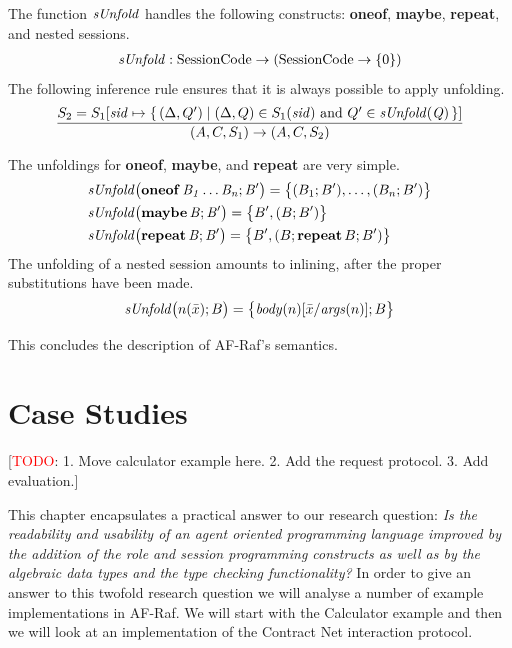 \documentclass[a4paper,12pt,oneside,fleqn]{book} %
\newcommand{\todo}[1]{[\textcolor{red}{TODO}: #1]}
\begin{document}
The function $\it sUnfold$ handles the following constructs: {\bf oneof},
{\bf maybe}, {\bf repeat}, and nested sessions.
\begin{align}
{\it sUnfold} : {\rm SessionCode}\to({\rm SessionCode}\to\{0\})
\end{align}
The following inference rule ensures that it is always possible to apply
unfolding.
\begin{align}
\frac
  {S_2=S_1[{\it sid}\mapsto\{\,(\Delta,Q')
    \mid\text{$(\Delta,Q)\in S_1({\it sid})$ and $Q'\in{\it sUnfold(Q)}$}\,\}]}
  {(A,C,S_1)\to(A,C,S_2)}
\end{align}

The unfoldings for {\bf oneof}, {\bf maybe}, and {\bf repeat} are very
simple.
\begin{align}
&{\it sUnfold\bigl({\bf oneof}\,B_1\ldots B_n; B'\bigr)}
  = \bigl\{ (B_1;B'),\ldots,(B_n;B')\bigr\}
\\
&{\it sUnfold\bigl({\bf maybe}\,B;B'\bigr)}
  = \bigl\{ B', (B;B')\bigr\} \\
&{\it sUnfold\bigl({\bf repeat}\,B;B'\bigr)}
  = \bigl\{ B', (B;{\bf repeat}\,B;B')\bigr\}
\end{align}
The unfolding of a nested session amounts to inlining, after the proper
substitutions have been made.
\begin{align}
{\it sUnfold}\bigl(n(\bar{x}); B\bigr)
  = \bigl\{ {\it body}(n)[\bar{x}/{\it args}(n)]; B \bigr\}
\end{align}

This concludes the description of AF-Raf's semantics.


\chapter{Case Studies}\label{ch:casestudy} %

\todo{1. Move calculator example here. 2. Add the request protocol. 3. Add
evaluation.}

This chapter encapsulates a practical answer to our research question:
\textit{Is the readability and usability of an agent oriented programming
  language improved by the addition of the role and session programming
  constructs as well as by the algebraic data types and the type checking
functionality?} In order to give an answer to this twofold research
question we will analyse a number of example implementations in AF-Raf. We
will start with the Calculator example and then we will look at an
implementation of the Contract Net interaction protocol.
\end{document}

